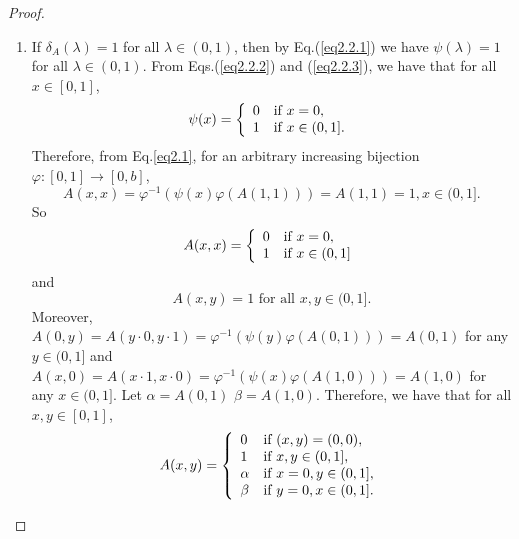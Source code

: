 \documentclass[12pt]{article}
\begin{document}
\begin{proof}
\begin{enumerate}
\item [(\romannumeral 1)] If $\delta_{A}(\lambda)=1$ for all $\lambda\in(0, 1)$, then by Eq.(\ref{eq2.2.1}) we have
$\psi(\lambda)=1$ for all $\lambda\in(0, 1)$. From Eqs.(\ref{eq2.2.2}) and (\ref{eq2.2.3}),
we have that for all $x\in [0,1]$,
$$\psi(x)=\left\{\begin{array}{ll}
0 & {\mbox{\scriptsize\normalsize if } x=0,}\\
1 & {\mbox{\scriptsize\normalsize if } x \in(0, 1].}
\end{array}
\right.$$
Therefore, from Eq.\eqref{eq2.1}, for an arbitrary increasing bijection $\varphi:[0, 1] \rightarrow[0, b]$,
$$A(x, x) =\varphi^{-1}(\psi(x)\varphi(A(1, 1)))=A(1, 1)=1, x \in(0, 1].$$
So
\begin{equation*}
A(x,x)=\left\{\begin{array}{ll}
0 & {\mbox{\scriptsize\normalsize if  } x=0},\\
1 & {\mbox{\scriptsize\normalsize if  } x\in(0, 1]}
\end{array}
\right.
\end{equation*}
and
$$A(x,y)=1 \mbox{ for all } x,y \in(0, 1].$$
Moreover, $A(0,y)=A(y\cdot0,y\cdot1)=\varphi^{-1}(\psi(y)\varphi(A(0, 1)))=A(0, 1)$ for any $y\in(0, 1]$ and $A(x,0)=A(x\cdot1,x\cdot0)=\varphi^{-1}(\psi(x)\varphi(A(1, 0)))=A(1, 0)$ for any $x\in(0, 1]$. Let $\alpha=A(0, 1)$ $\beta=A(1, 0)$.
Therefore, we have that for all $x, y\in [0,1]$,
$$A(x,y)=\left\{\begin{array}{ll}
0 & {\mbox{\scriptsize\normalsize if  } (x,y)=(0,0)},\\
1 & {\mbox{\scriptsize\normalsize if  } x,y \in(0, 1]},\\
\alpha & {\mbox{\scriptsize\normalsize if  } x=0, y\in(0, 1]},\\
\beta & {\mbox{\scriptsize\normalsize if  } y=0, x\in(0, 1]}.
\end{array}
\right.$$


\end{enumerate}
\end{proof}
\end{document}
